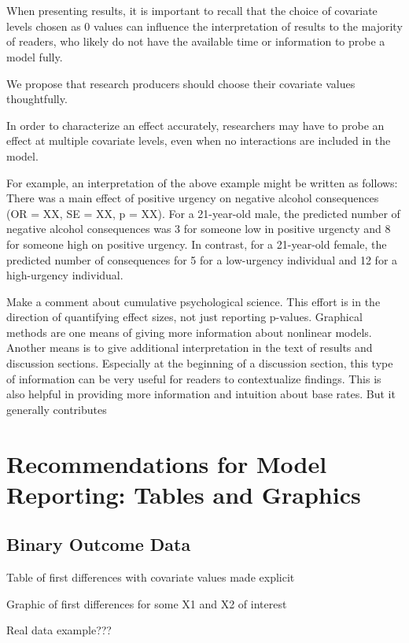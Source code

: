 \documentclass[jou, apacite]{apa6}
\begin{document}
\section{}
When presenting results, it is important to recall that the choice of covariate levels chosen as 0 values can influence the interpretation of results to the majority of readers, who likely do not have the available time or information to probe a model fully. 

We propose that research producers should choose their covariate values thoughtfully. 

In order to characterize an effect accurately, researchers may have to probe an effect at multiple covariate levels, even when no interactions are included in the model.

For example, an interpretation of the above example might be written as follows: There was a main effect of positive urgency on negative alcohol consequences (OR = XX, SE = XX, p = XX). For a 21-year-old male, the predicted number of negative alcohol consequences was 3 for someone low in positive urgencty and 8 for someone high on positive urgency. In contrast, for a 21-year-old female, the predicted number of consequences for 5 for a low-urgency individual and 12 for a high-urgency individual.

Make a comment about cumulative psychological science. This effort is in the direction of quantifying effect sizes, not just reporting p-values. Graphical methods are one means of giving more information about nonlinear models. Another means is to give additional interpretation in the text of results and discussion sections. Especially at the beginning of a discussion section, this type of information can be very useful for readers to contextualize findings. This is also helpful in providing more information and intuition about base rates. But it generally contributes 

\section{Recommendations for Model Reporting: Tables and Graphics}
\subsection{Binary Outcome Data}
Table of first differences with covariate values made explicit

Graphic of first differences for some X1 and X2 of interest	

Real data example???
\end{document}
